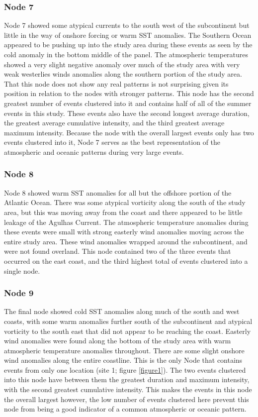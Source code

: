 \documentclass[utf8]{frontiersSCNS}
\begin{document}
\subsubsection{Node 7}
Node 7 showed some atypical currents to the south west of the subcontinent but little in the way of onshore forcing or warm SST anomalies. The Southern Ocean appeared to be pushing up into the study area during these events as seen by the cold anomaly in the bottom middle of the panel. The atmospheric temperatures showed a very slight negative anomaly over much of the study area with very weak westerlies winds anomalies along the southern portion of the study area. That this node does not show any real patterns is not surprising given its position in relation to the nodes with stronger patterns. This node has the second greatest number of events clustered into it and contains half of all of the summer events in this study. These events also have the second longest average duration, the greatest average cumulative intensity, and the third greatest average maximum intensity. Because the node with the overall largest events only has two events clustered into it, Node 7 serves as the best representation of the atmospheric and oceanic patterns during very large events. 

\subsubsection{Node 8}
Node 8 showed warm SST anomalies for all but the offshore portion of the Atlantic Ocean. There was some atypical vorticity along the south of the study area, but this was moving away from the coast and there appeared to be little leakage of the Agulhas Current. The atmospheric temperature anomalies during these events were small with strong easterly wind anomalies moving across the entire study area. These wind anomalies wrapped around the subcontinent, and were not found overland. This node contained two of the three events that occurred on the east coast, and the third highest total of events clustered into a single node.

\subsubsection{Node 9}
The final node showed cold SST anomalies along much of the south and west coasts, with some warm anomalies further south of the subcontinent and atypical vorticity to the south east that did not appear to be reaching the coast. Easterly wind anomalies were found along the bottom of the study area with warm atmospheric temperature anomalies throughout. There are some slight onshore wind anomalies along the entire coastline. This is the only Node that contains events from only one location (site 1; figure \ref{figure1}). The two events clustered into this node have between them the greatest duration and maximum intensity, with the second greatest cumulative intensity. This makes the events in this node the overall largest however, the low number of events clustered here prevent this node from being a good indicator of a common atmospheric or oceanic pattern.
\end{document}
